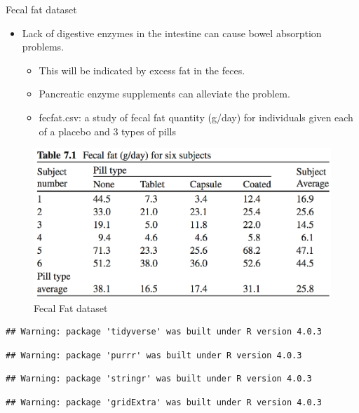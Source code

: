 \documentclass[
  ignorenonframetext,
]{beamer}
\providecommand{\tightlist}{%
  \setlength{\itemsep}{0pt}\setlength{\parskip}{0pt}}
\begin{document}
\begin{frame}[fragile]{Fecal fat dataset}
\protect\hypertarget{fecal-fat-dataset}{}

\begin{itemize}
\tightlist
\item
  Lack of digestive enzymes in the intestine can cause bowel absorption
  problems.

  \begin{itemize}
  \tightlist
  \item
    This will be indicated by excess fat in the feces.
  \item
    Pancreatic enzyme supplements can alleviate the problem.
  \item
    fecfat.csv: a study of fecal fat quantity (g/day) for individuals
    given each of a placebo and 3 types of pills
  \end{itemize}
\end{itemize}

\begin{figure}
\centering
\includegraphics{VittinghoffTable71.png}
\caption{Fecal Fat dataset}
\end{figure}

\begin{verbatim}
## Warning: package 'tidyverse' was built under R version 4.0.3
\end{verbatim}

\begin{verbatim}
## Warning: package 'purrr' was built under R version 4.0.3
\end{verbatim}

\begin{verbatim}
## Warning: package 'stringr' was built under R version 4.0.3
\end{verbatim}

\begin{verbatim}
## Warning: package 'gridExtra' was built under R version 4.0.3
\end{verbatim}

\end{frame}
\end{document}
